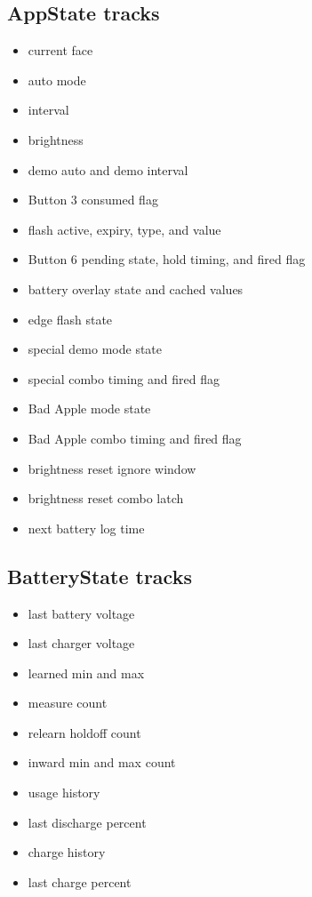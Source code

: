 \documentclass[11pt]{article}
\begin{document}
\subsection{AppState tracks}
\begin{itemize}
  \item current face
  \item auto mode
  \item interval
  \item brightness
  \item demo auto and demo interval
  \item Button 3 consumed flag
  \item flash active, expiry, type, and value
  \item Button 6 pending state, hold timing, and fired flag
  \item battery overlay state and cached values
  \item edge flash state
  \item special demo mode state
  \item special combo timing and fired flag
  \item Bad Apple mode state
  \item Bad Apple combo timing and fired flag
  \item brightness reset ignore window
  \item brightness reset combo latch
  \item next battery log time
\end{itemize}

\subsection{BatteryState tracks}
\begin{itemize}
  \item last battery voltage
  \item last charger voltage
  \item learned min and max
  \item measure count
  \item relearn holdoff count
  \item inward min and max count
  \item usage history
  \item last discharge percent
  \item charge history
  \item last charge percent
\end{itemize}
\end{document}
